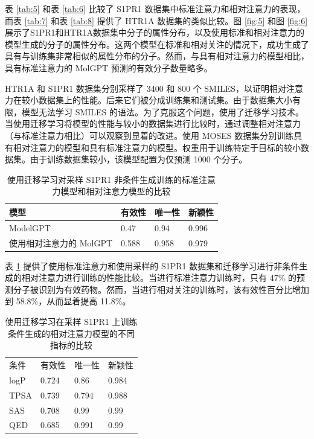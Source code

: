 表 \ref{tab:5} 和表 \ref{tab:6} 比较了 S1PR1 数据集中标准注意力和相对注意力的表现，而表 \ref{tab:7} 和表 \ref{tab:8} 提供了 HTR1A 数据集的类似比较。图 \ref{fig:5} 和图 \ref{fig:6} 展示了S1PR1和HTR1A数据集中分子的属性分布，以及使用标准和相对注意力的模型生成的分子的属性分布。这两个模型在标准和相对关注的情况下，成功生成了具有与训练集非常相似的属性分布的分子。然而，与具有相对注意力的模型相比，具有标准注意力的 MolGPT 预测的有效分子数量略多。

HTR1A 和 S1PR1 数据集分别采样了 3400 和 800 个 SMILES，以证明相对注意力在较小数据集上的性能。后来它们被分成训练集和测试集。由于数据集大小有限，模型无法学习 SMILES 的语法。为了克服这个问题，使用了迁移学习技术。当使用迁移学习将模型的性能与较小的数据集进行比较时，通过调整相对注意力（与标准注意力相比）可以观察到显着的改进。使用 MOSES 数据集分别训练具有相对注意力的模型和具有标准注意力的模型。权重用于训练特定于目标的较小数据集。由于训练数据集较小，该模型配置为仅预测 1000 个分子。

\begin{table}[H]
  \centering
  \caption{使用迁移学习对采样 S1PR1 非条件生成训练的标准注意力模型和相对注意力模型的比较}
  \label{tab:9}
  \begin{tabular}{llll}
    \hline 模型 & 有效性 & 唯一性 & 新颖性 \\
    \hline ModelGPT & 0.47 & 0.94 & 0.996 \\
    使用相对注意力的 MolGPT & 0.588 & 0.958 & 0.979 \\
    \hline
    \end{tabular}
\end{table}

表 \ref{tab:9} 提供了使用标准注意力和使用采样的 S1PR1 数据集和迁移学习进行非条件生成的相对注意力进行训练的性能比较。当进行标准注意力训练时，只有 47\% 的预测分子被识别为有效药物。然而，当进行相对关注的训练时，该有效性百分比增加到 58.8\%，从而显着提高 11.8\%。

\begin{table}[H]
  \centering
  \caption{使用迁移学习在采样 S1PR1 上训练条件生成的相对注意力模型的不同指标的比较}
  \label{tab:10}
  \begin{tabular}{llll}
    \hline 条件 & 有效性 & 唯一性 & 新颖性 \\
    logP & 0.724 & 0.86 & 0.984 \\
    TPSA & 0.739 & 0.794 & 0.988 \\
    SAS & 0.708 & 0.99 & 0.99 \\
    QED & 0.685 & 0.991 & 0.99 \\
    \hline
    \end{tabular}
\end{table}


